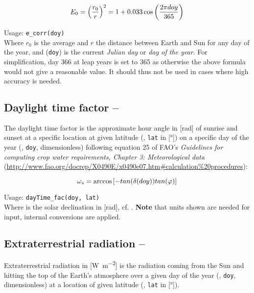 \begin{equation}\label{eqn:meteo:eccorr}
E_{0}{} = \left( \frac{r_0}{r} \right)^2 = 1 + 0.033 \cos \left(\frac{2 \pi doy}{365} \right)
\end{equation}

\noindent
Usage:
\verb!e_corr(doy)!\\

Where $r_0$ is the average and $r$ the distance between Earth and Sun for any day of the year, and \doy{} (\verb!doy!) is the current \emph{Julian day} or \emph{day of the year}. For simplification, day \num{366} at leap years is set to \num{365} as otherwise the above formula would not give a reasonable value. It should thus not be used in cases where high accuracy is needed.


\subsection{Daylight time factor -- \dayTimeFac} \label{sec:meteo:daytimefac}
The daylight time factor \dayTimeFac{} is the approximate hour angle in [\si{\radian}] of sunrise and sunset at a specific location at given latitude (\lat{}, \verb!lat! in [\si{\degree}]) on a specific day of the year (\doy{}, \verb!doy!, dimensionless) following equation 25 of FAO's \emph{Guidelines for computing crop water requirements, Chapter 3: Meteorological data} (\url{http://www.fao.org/docrep/X0490E/x0490e07.htm#calculation\%20procedures}):

\begin{equation}\label{eqn:meteo:daytimefac}
\omega_{s}{} = \arccos \left[ -tan(\delta{(\ensuremath{doy})}) tan(\varphi{}) \right]
\end{equation}

\noindent
Usage:
\verb!dayTime_fac(doy, lat)!\\

Where \solDecl{} is the solar declination in [\si{\radian}], cf. . \textbf{Note} that units shown are needed for input, internal conversions are applied.


\subsection{Extraterrestrial radiation -- \radExtraterr} \label{sec:meteo:radex}
Extraterrestrial radiation \radExtraterr{} in [\si{\watt\per\metre\squared}] is the radiation coming from the Sun and hitting the top of the Earth's atmosphere over a given day of the year (\doy{}, \verb!doy!, dimensionless) at a location of given latitude (\lat{}, \verb!lat! in [\si{\degree}]).

